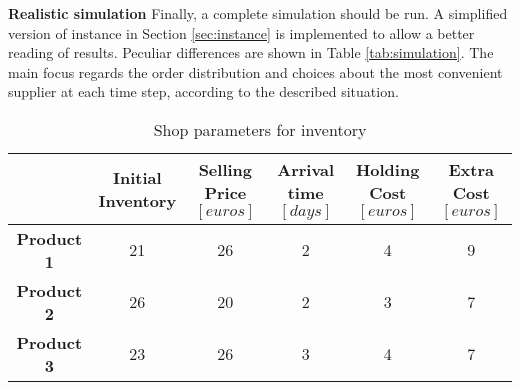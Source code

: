 \documentclass{article}
\begin{document}
\noindent
\newline
\textbf{Realistic simulation}\newline
Finally, a complete simulation should be run. A simplified version of instance in Section \ref{sec:instance} is implemented to allow a better reading of results. Peculiar differences are shown in Table \ref{tab:simulation}. The main focus regards the order distribution and choices about the most convenient supplier at each time step, according to the described situation.

\begin{table}[H]
\vspace{30pt}
    \centering
    \begin{subtable}[c]{\textwidth}
        \centering
    \begin{adjustbox}{center}
    \begin{tabular}{|c|c|c|c|c|c|}
    \hline
    & \makecell{\textbf{Initial}\\ \textbf{Inventory}} & \makecell{\textbf{Selling Price}\\$[euros]$} & \makecell{\textbf{Arrival time}\\$[days]$} & \makecell{\textbf{Holding Cost} \\$[euros]$} & \makecell{\textbf{Extra Cost} \\$[euros]$} \\
    \hline
    \textbf{Product 1} & 21 & 26 & 2 & 4 & 9\\
    \hline
    \textbf{Product 2} & 26 & 20 & 2 & 3 & 7\\
    \hline
    \textbf{Product 3} & 23 & 26 & 3 & 4 & 7\\
    \hline
    \end{tabular}
    \end{adjustbox}
    \caption{Shop parameters for inventory}
    \vspace{5mm}
    \end{subtable}
    

\end{table}
\end{document}
